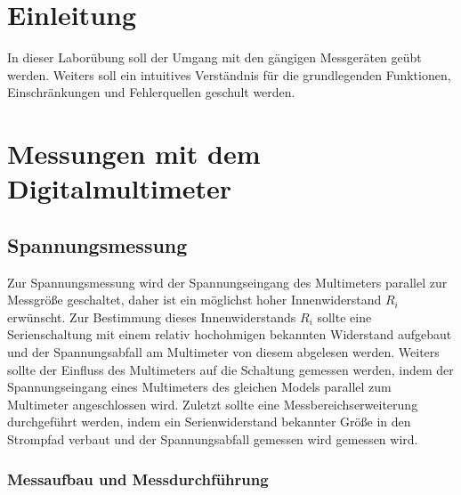 \documentclass[a4paper]{article}
\begin{document}

\newpage
\section{Einleitung}
In dieser Laborübung soll der Umgang mit den gängigen Messgeräten geübt werden.
Weiters soll ein intuitives Verständnis für die grundlegenden Funktionen,
Einschränkungen und Fehlerquellen geschult werden.\newline 

\section{Messungen mit dem Digitalmultimeter}
\subsection{Spannungsmessung}
Zur Spannungsmessung wird der Spannungseingang des Multimeters parallel zur Messgröße
geschaltet, daher ist ein möglichst hoher Innenwiderstand $R_{i}$ erwünscht. Zur
Bestimmung dieses Innenwiderstands $R_{i}$ sollte eine Serienschaltung mit einem 
relativ hochohmigen bekannten Widerstand aufgebaut und der Spannungsabfall am Multimeter
von diesem abgelesen werden.\newline
Weiters sollte der Einfluss des Multimeters auf die Schaltung gemessen werden,
indem der Spannungseingang eines Multimeters des gleichen Models parallel zum 
Multimeter angeschlossen wird. \newline
Zuletzt sollte eine Messbereichserweiterung durchgeführt werden, indem ein
Serienwiderstand bekannter Größe in den Strompfad verbaut und der 
Spannungsabfall gemessen wird gemessen wird.

\subsubsection{Messaufbau und Messdurchführung}
\end{document}

